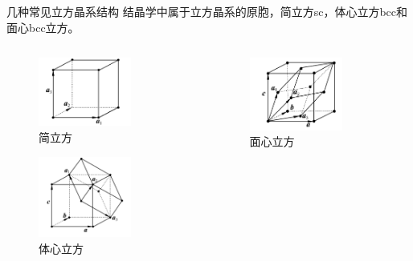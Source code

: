 \documentclass[trans]{beamer} %
\begin{document}
\begin{frame}{几种常见立方晶系结构}
结晶学中属于立方晶系的原胞，简立方sc，体心立方bcc和面心bcc立方。\\
            
    \begin{columns}
        \begin{column}{0.5\textwidth}
        
         \begin{figure}[htbp] 
            \centering\includegraphics[width=1.2in]{source/ch2/fg205.png} \caption{简立方}%
            \end{figure}
            \begin{figure}[htbp] 
            \centering\includegraphics[width=1.2in]{source/ch2/fg206.png} \caption{体心立方} 
            \end{figure}
        \end{column}
        \begin{column}{0.5\textwidth}
        \begin{figure}[htbp] 
            \centering\includegraphics[width=1.2in]{source/ch2/fg207.png} \caption{面心立方}%
            \end{figure}
        
        \end{column}
        \end{columns}        
           
            
\end{frame}
\end{document}
